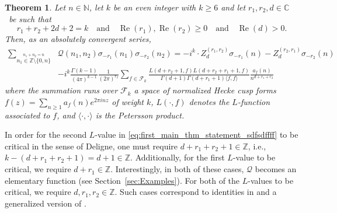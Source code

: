 \documentclass[]{article}
\newtheorem{letterthm}{Theorem}
\renewcommand{\Re}{\operatorname{Re}}
\begin{document}
\begin{letterthm}
\label{thm:THEOREM-A} 
Let $n \in \mathbb{N}$, let $k$ be an even integer with $k \ge 6$ and 
let $r_1, r_2, d \in \mathbb{C}$ \ be such that 
\begin{equation}\label{eq:cond_1}
    r_1 + r_2 + 2 d + 2 = k\ \ \  \text{ and } \ \ \ \Re(r_1), \Re(r_2) \ge 0 \ \ \ \text{ and } \ \ \  \Re(d) > 0.
\end{equation}
Then, as an absolutely convergent series,
\begin{equation}\label{eq:first_main_thm_statement_sdfsdffff}
\begin{split}
    \sum_{\stackrel{n_1+n_2 = n}{n_1 \in \mathbb{Z} \setminus \{ 0, n \} }} & \mathcal{Q}(n_1,n_2)  \sigma_{-r_1}(n_1) \sigma_{-r_2}(n_2) 
   =   - i^{ k} \cdot  {Z}^{ (r_1,r_2) }_d\sigma _{-r_1}(n)    - {Z}^{(r_2,r_1)}_d\sigma_{-r_2}(n)    \\
& - i^{k} \frac{\Gamma(k-1)}{ (4 \pi )^{k-1}} \frac{1}{  (2 \pi)^{r_2} } \sum_{f \in \mathcal{F}_k}  \frac{L( d+r_2+1,f ) L( d+r_2+r_1+1, f ) }{ \Gamma(d+1) \Gamma(d+r_1+1)  \langle f,  f \rangle } \frac{a_f(n)}{n^{d+r_1+r_2}}
\end{split}
\end{equation}
where the summation runs over  $\mathcal{F}_k$ a space of normalized Hecke  cusp forms $f(z)=\sum_{n\geq 1}a_f(n)e^{2\pi i n z}$ of weight $k$, $L(\cdot, f)$ denotes the $L$-function associated to $f$, and $\langle \cdot, \cdot \rangle$ is the Petersson product. 
\end{letterthm}


    In order for the second $L$-value in \eqref{eq:first_main_thm_statement_sdfsdffff} to be critical in the sense of Deligne, one must require $d+r_1+r_2+1 \in \mathbb{Z}$, i.e.,  $k-(d+r_1+r_2+1) = d + 1 \in \mathbb{Z}$.  Additionally, for the first $L$-value to be critical, we require $d+r_1 \in \mathbb{Z}$. Interestingly, in both of these cases, $\mathcal{Q}$ becomes an elementary function (see Section~\ref{sec:Examples}). For both of the $L$-values to be critical, we require $d, r_1, r_2 \in \mathbb{Z}$. Such cases correspond to identities in \cite{FKLR} and a generalized version of  \cite{diamantis2010kernels, o2023identities}. 
\end{document}
